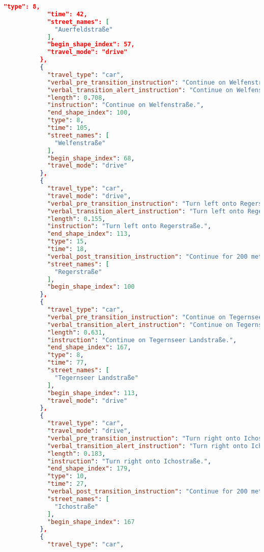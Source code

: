 \begin{lstlisting}[language=json,breaklines=true]
            "type": 8,
            "time": 42,
            "street_names": [
              "Auerfeldstraße"
            ],
            "begin_shape_index": 57,
            "travel_mode": "drive"
          },
          {
            "travel_type": "car",
            "verbal_pre_transition_instruction": "Continue on Welfenstraße for 700 meters.",
            "verbal_transition_alert_instruction": "Continue on Welfenstraße.",
            "length": 0.708,
            "instruction": "Continue on Welfenstraße.",
            "end_shape_index": 100,
            "type": 8,
            "time": 105,
            "street_names": [
              "Welfenstraße"
            ],
            "begin_shape_index": 68,
            "travel_mode": "drive"
          },
          {
            "travel_type": "car",
            "travel_mode": "drive",
            "verbal_pre_transition_instruction": "Turn left onto Regerstraße.",
            "verbal_transition_alert_instruction": "Turn left onto Regerstraße.",
            "length": 0.155,
            "instruction": "Turn left onto Regerstraße.",
            "end_shape_index": 113,
            "type": 15,
            "time": 18,
            "verbal_post_transition_instruction": "Continue for 200 meters.",
            "street_names": [
              "Regerstraße"
            ],
            "begin_shape_index": 100
          },
          {
            "travel_type": "car",
            "verbal_pre_transition_instruction": "Continue on Tegernseer Landstraße for 600 meters.",
            "verbal_transition_alert_instruction": "Continue on Tegernseer Landstraße.",
            "length": 0.631,
            "instruction": "Continue on Tegernseer Landstraße.",
            "end_shape_index": 167,
            "type": 8,
            "time": 77,
            "street_names": [
              "Tegernseer Landstraße"
            ],
            "begin_shape_index": 113,
            "travel_mode": "drive"
          },
          {
            "travel_type": "car",
            "travel_mode": "drive",
            "verbal_pre_transition_instruction": "Turn right onto Ichostraße.",
            "verbal_transition_alert_instruction": "Turn right onto Ichostraße.",
            "length": 0.183,
            "instruction": "Turn right onto Ichostraße.",
            "end_shape_index": 179,
            "type": 10,
            "time": 27,
            "verbal_post_transition_instruction": "Continue for 200 meters.",
            "street_names": [
              "Ichostraße"
            ],
            "begin_shape_index": 167
          },
          {
            "travel_type": "car",

\end{lstlisting}
